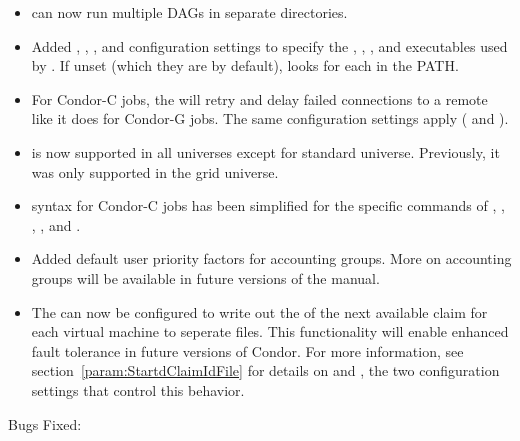 \begin{itemize}

\item {} can now run multiple DAGs in separate directories.


\item Added ,
, ,
and  configuration settings to specify
the , , , and 
executables used by .  If unset (which they are by
default),  looks for each in the PATH.

\item For Condor-C jobs, the  will retry and delay
  failed connections to a remote  like it does for
  Condor-G jobs. The same configuration settings apply 
  ( and
  ).

\item {} is now supported in all universes except
for standard universe.  Previously, it was only supported in the grid universe.

\item {} syntax for Condor-C jobs has been
simplified for the specific commands of
, , , , and .

\item Added default user priority factors for accounting groups.  More on
        accounting groups will be available in future versions of the manual.

\item The  can now be configured to write out the
   of the next available claim for each virtual machine
  to seperate files.
  This functionality will enable enhanced fault tolerance in future
  versions of Condor.
  For more information, see section~\ref{param:StartdClaimIdFile} for
  details on  and
  , the two configuration settings that
  control this behavior.

\end{itemize}

\noindent Bugs Fixed:

